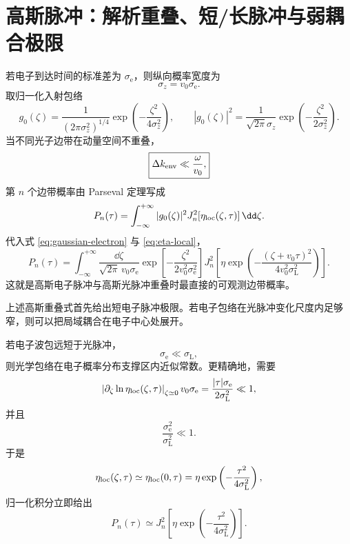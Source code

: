 \section{高斯脉冲：解析重叠、短/长脉冲与弱耦合极限}
若电子到达时间的标准差为 $\sigma_{\mathrm e}$，则纵向概率宽度为
\[
\sigma_z=v_0\sigma_{\mathrm e}.
\]
取归一化入射包络
\begin{equation}
g_0(\zeta)
=
\frac{1}{(2\pi\sigma_z^2)^{1/4}}
\exp\left(-\frac{\zeta^2}{4\sigma_z^2}\right),
\qquad
|g_0(\zeta)|^2
=
\frac{1}{\sqrt{2\pi}\sigma_z}
\exp\left(-\frac{\zeta^2}{2\sigma_z^2}\right).
\label{eq:gaussian-electron}
\end{equation}
当不同光子边带在动量空间不重叠，
\begin{equation}
\boxed{
\Delta k_{\rm env}\ll\frac{\omega}{v_0},}
\label{eq:special-nonoverlap}
\end{equation}
第 $n$ 个边带概率由 Parseval 定理写成
\begin{equation}
P_n(\tau)
=
\int_{-\infty}^{+\infty}
|g_0(\zeta)|^2
J_n^2\!\left[\eta_{\rm loc}(\zeta,\tau)\right]\dd\zeta.
\label{eq:Pn-general-gaussian}
\end{equation}
代入式 \eqref{eq:gaussian-electron} 与 \eqref{eq:eta-local}，
\begin{equation}
\boxed{
P_n(\tau)
=
\int_{-\infty}^{+\infty}
\frac{\dd\zeta}{\sqrt{2\pi}\,v_0\sigma_{\mathrm e}}
\exp\left[-\frac{\zeta^2}{2v_0^2\sigma_{\mathrm e}^2}\right]
J_n^2\!\left[
\eta
\exp\left(
-\frac{(\zeta+v_0\tau)^2}
{4v_0^2\sigma_{\mathrm L}^2}
\right)
\right].}
\label{eq:Pn-gaussian}
\end{equation}
这就是高斯电子脉冲与高斯光脉冲重叠时最直接的可观测边带概率。

上述高斯重叠式首先给出短电子脉冲极限。若电子包络在光脉冲变化尺度内足够窄，则可以把局域耦合在电子中心处展开。

若电子波包远短于光脉冲，
\begin{equation}
\boxed{\sigma_{\mathrm e}\ll\sigma_{\mathrm L},}
\label{eq:short-electron}
\end{equation}
则光学包络在电子概率分布支撑区内近似常数。更精确地，需要
\begin{equation}
\left|
\partial_\zeta\ln \eta_{\rm loc}(\zeta,\tau)
\right|_{\zeta\simeq0}
v_0\sigma_{\mathrm e}
=
\frac{|\tau|\sigma_{\mathrm e}}{2\sigma_{\mathrm L}^2}
\ll1,
\end{equation}
并且
\[
\frac{\sigma_{\mathrm e}^2}{\sigma_{\mathrm L}^2}\ll1.
\]
于是
\[
\eta_{\rm loc}(\zeta,\tau)\simeq \eta_{\rm loc}(0,\tau)
=
\eta\exp\left(-\frac{\tau^2}{4\sigma_{\mathrm L}^2}\right),
\]
归一化积分立即给出
\begin{equation}
\boxed{
P_n(\tau)
\simeq
J_n^2\!\left[
\eta
\exp\left(-\frac{\tau^2}{4\sigma_{\mathrm L}^2}\right)
\right].}
\label{eq:Pn-short-electron}
\end{equation}


